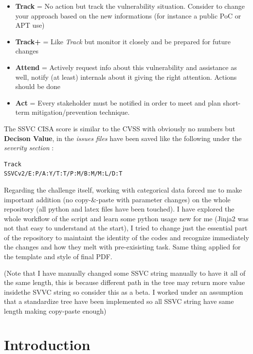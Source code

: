 \documentclass[a4paper]{article}
\def\tightlist{}
\begin{document}
\begin{itemize}
\tightlist
\item
  \textbf{Track} = No action but track the vulnerability situation. Consider to change your approach based on the new informations (for instance a public PoC or APT use)
\item
  \textbf{Track+} = Like \emph{Track} but monitor it closely and be prepared for future changes
\item
  \textbf{Attend} = Actively request info about this vulnerability and assistance as well, notify (at least) internals about it giving the right attention. Actions should be done
\item
  \textbf{Act} = Every stakeholder must be notified in order to meet and plan short-term mitigation/prevention technique.
\end{itemize}

The SSVC CISA score is similar to the CVSS with obviously no numbers but \textbf{Decison Value}, in the \emph{issues files} have been saved like the following under the \emph{severity section} :

\begin{lstlisting}
Track
SSVCv2/E:P/A:Y/T:T/P:M/B:M/M:L/D:T
\end{lstlisting}

Regarding the challenge itself, working with categorical data forced me to make important addition (no copy-\&-paste with parameter changes) on the whole repository (all python and latex files have been touched).
I have explored the whole workflow of the script and learn some python usage new for me (Jinja2 was not that easy to understand at the start), I tried to change just the essential
part of the repository to maintaint the identity of the codes and recognize immediately the changes and how they melt with pre-exisisting task. Same thing applied for the template and style
of final PDF.

(Note that I have manually changed some SSVC string manually to have it all of the same length, this is because different path in the tree may return more value insidethe SVVC string
so consider this as a beta. I worked under an assumption that a standardize tree have been implemented so all SSVC string have same length making copy-paste enough)


\clearpage
\tableofcontents

\clearpage
\section{Introduction}
\end{document}
